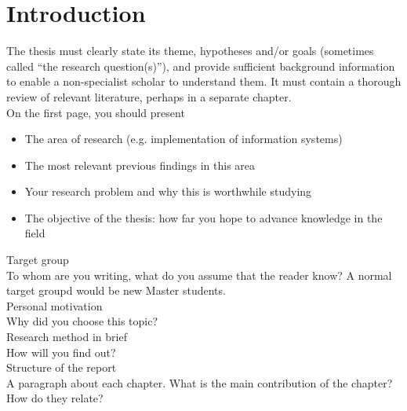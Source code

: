 \chapter{Introduction}
   The thesis must clearly state its theme, hypotheses and/or goals
    (sometimes called “the research question(s)”), and provide sufficient background information to 
    enable a non-specialist scholar to understand them. It must contain a thorough review of 
    relevant literature, perhaps in a separate chapter. \\

  On the first page, you should present
  \begin{itemize}
    \item The area of research (e.g. implementation of information systems)
    \item The most relevant previous findings in this area
    \item Your research problem and why this is worthwhile studying
    \item The objective of the thesis: how far you hope to advance knowledge in the field
  \end{itemize}
  Target group \\
  To whom are you writing, what do you assume that the reader know? A normal target groupd would be 
    new Master students. \\
  Personal motivation \\
  Why did you choose this topic? \\
  Research method in brief \\
  How will you find out? \\
  Structure of the report \\
  A paragraph about each chapter. What is the main contribution of the chapter? How do they relate? \\

